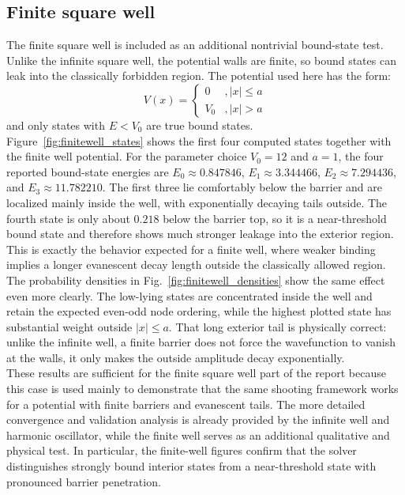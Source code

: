 \documentclass[11pt]{article}
\begin{document}
\begin{refsection}
        \subsection{Finite square well}
            The finite square well is included as an additional nontrivial bound-state test. Unlike the infinite square well, the potential walls are finite, so bound states can leak into the classically forbidden region. The potential used here has the form:
            \begin{equation}
            V(x)=\begin{cases}
            0 & ,|x|\le a\\
            V_0 & ,|x|>a
            \end{cases}
            \end{equation}
            and only states with $E<V_0$ are true bound states. \\

            Figure~\ref{fig:finitewell_states} shows the first four computed states together with the finite well potential. For the parameter choice $V_0=12$ and $a=1$, the four reported bound-state energies are $E_0\approx0.847846$, $E_1\approx3.344466$, $E_2\approx7.294436$, and $E_3\approx11.782210$. The first three lie comfortably below the barrier and are localized mainly inside the well, with exponentially decaying tails outside. The fourth state is only about $0.218$ below the barrier top, so it is a near-threshold bound state and therefore shows much stronger leakage into the exterior region. This is exactly the behavior expected for a finite well, where weaker binding implies a longer evanescent decay length outside the classically allowed region. \\

            The probability densities in Fig.~\ref{fig:finitewell_densities} show the same effect even more clearly. The low-lying states are concentrated inside the well and retain the expected even-odd node ordering, while the highest plotted state has substantial weight outside $|x|\le a$. That long exterior tail is physically correct: unlike the infinite well, a finite barrier does not force the wavefunction to vanish at the walls, it only makes the outside amplitude decay exponentially. \\

            These results are sufficient for the finite square well part of the report because this case is used mainly to demonstrate that the same shooting framework works for a potential with finite barriers and evanescent tails. The more detailed convergence and validation analysis is already provided by the infinite well and harmonic oscillator, while the finite well serves as an additional qualitative and physical test. In particular, the finite-well figures confirm that the solver distinguishes strongly bound interior states from a near-threshold state with pronounced barrier penetration. \\


\end{refsection}
\end{document}
